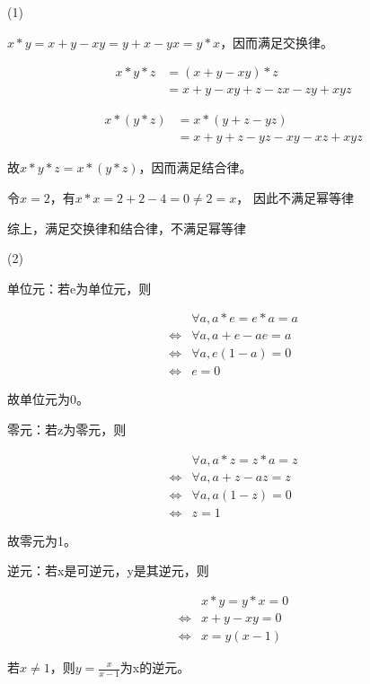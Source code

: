 \documentclass[UTF8]{ctexart}
\begin{document}
(1)

$x * y = x + y - xy = y + x - yx = y * x$，因而满足交换律。

\[
\begin{aligned}
    x * y * z &= (x + y - xy) * z\\
              &= x + y - xy + z - zx -zy + xyz
\end{aligned}    
\]

\[
\begin{aligned}
    x * (y * z) &= x * (y + z - yz)\\
                &= x + y + z - yz - xy - xz + xyz
\end{aligned}    
\]

故$x * y * z = x * (y * z)$，因而满足结合律。

令$x = 2$，有$x * x = 2 + 2 - 4 = 0 \neq 2 = x$，
因此不满足幂等律

综上，满足交换律和结合律，不满足幂等律

(2)

单位元：若e为单位元，则

\[
\begin{aligned}
    &\forall a, a * e = e * a = a\\
    \Leftrightarrow &\forall a, a + e - ae = a\\
    \Leftrightarrow &\forall a, e(1 - a) = 0\\
    \Leftrightarrow &e = 0
\end{aligned}
\]

故单位元为0。

零元：若z为零元，则

\[
\begin{aligned}
    &\forall a, a * z = z * a = z\\
    \Leftrightarrow &\forall a, a + z - az = z\\
    \Leftrightarrow &\forall a, a(1 - z) = 0\\
    \Leftrightarrow &z = 1
\end{aligned}    
\]

故零元为1。

逆元：若x是可逆元，y是其逆元，则

\[
\begin{aligned}
    &x * y = y * x = 0\\
    \Leftrightarrow & x + y - xy = 0\\
    \Leftrightarrow & x = y(x - 1)
\end{aligned}
\]

若$x\neq 1$，则$y = \frac{x}{x - 1}$为x的逆元。
\end{document}
